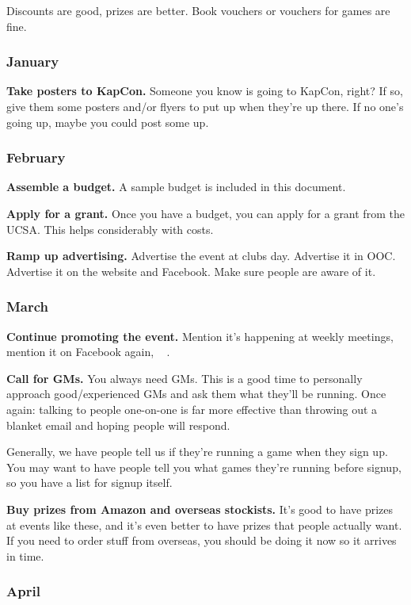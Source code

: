 Discounts are good, prizes are better. Book vouchers or vouchers for games are fine.

\subsubsection{January}

\textbf{Take posters to KapCon.} Someone you know is going to KapCon, right? If so, give them some posters and/or flyers to put up when they're up there. If no one's going up, maybe you could post some up.

\subsubsection{February}

\textbf{Assemble a budget.} A sample budget is included in this document.

\textbf{Apply for a grant.} Once you have a budget, you can apply for a grant from the UCSA. This helps considerably with costs.

\textbf{Ramp up advertising.} Advertise the event at clubs day. Advertise it in OOC. Advertise it on the website and Facebook. Make sure people are aware of it.

\subsubsection{March}

\textbf{Continue promoting the event.} Mention it's happening at weekly meetings, mention it on Facebook again, \etc~ \etc.

\textbf{Call for GMs.} You always need GMs. This is a good time to personally approach good/experienced GMs and ask them what they'll be running. Once again: talking to people one-on-one is far more effective than throwing out a blanket email and hoping people will respond.

Generally, we have people tell us if they're running a game when they sign up. You may want to have people tell you what games they're running before signup, so you have a list for signup itself.

\textbf{Buy prizes from Amazon and overseas stockists.} It's good to have prizes at events like these, and it's even better to have prizes that people actually want. If you need to order stuff from overseas, you should be doing it now so it arrives in time.

\subsubsection{April}

